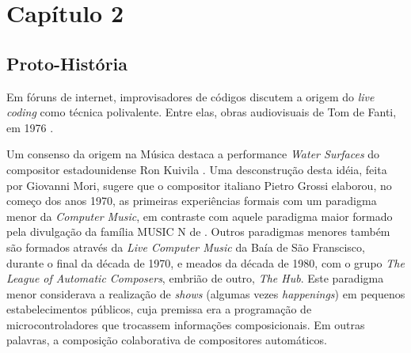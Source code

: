 

\section*{Capítulo 2}

\subsection*{Proto-História}

Em fóruns de internet, improvisadores de códigos discutem a origem do \emph{live coding} como técnica polivalente. Entre elas, obras audiovisuais de Tom de Fanti, em 1976 . 

Um consenso da origem na Música destaca a performance \emph{Water Surfaces} do compositor estadounidense Ron Kuivila \cite{ward_live_2004}. Uma desconstrução desta idéia, feita por Giovanni Mori, sugere que o compositor italiano Pietro Grossi elaborou, no começo dos anos 1970, as primeiras experiências formais com um paradigma menor da \emph{Computer Music}, em contraste com aquele paradigma maior formado pela divulgação da família MUSIC N de . Outros paradigmas menores também são formados através da \emph{Live Computer Music} da Baía de São Franscisco, durante o final da década de 1970, e meados da década de 1980, com o grupo \emph{The League of Automatic Composers}, embrião de outro, \emph{The Hub}. Este paradigma menor considerava a realização de \emph{shows} (algumas vezes \emph{happenings}) em pequenos estabelecimentos públicos, cuja premissa era a programação de microcontroladores que trocassem informações composicionais. Em outras palavras, a composição colaborativa de compositores automáticos.

